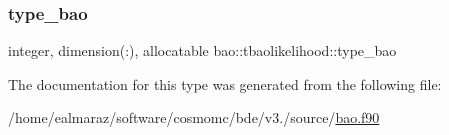 \mbox{\label{structbao_1_1tbaolikelihood_a1d5539c2f8ddeaf61d71be7ad8021ea9}} 
\subsubsection{\texorpdfstring{type\+\_\+bao}{type\_bao}}
{\footnotesize\ttfamily integer, dimension(\+:), allocatable bao\+::tbaolikelihood\+::type\+\_\+bao\hspace{0.3cm}{\ttfamily [private]}}



The documentation for this type was generated from the following file\+:\begin{DoxyCompactItemize}
\item 
/home/ealmaraz/software/cosmomc/bde/v3./source/\mbox{\hyperlink{bao_8f90}{bao.\+f90}}\end{DoxyCompactItemize}
